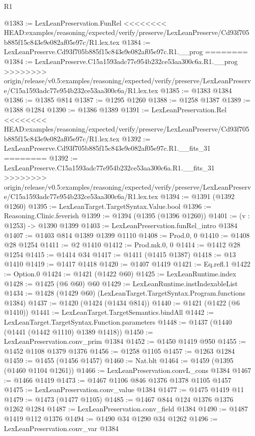 \begin{lexlean}{R1}
\begin{coremodule}
{{{{{{{{{{{{{{{{{{{{{{{{{{{{{{{{{{{{{{{{{{{{{{{{{{{{{{{{{{{{{{{{{{{{{{{{{{{{{{{{{{{{{{{{{{@1383 := LexLeanPreservation.FunRel
<<<<<<<< HEAD:examples/reasoning/expected/verify/preserve/LexLeanPreserve/Cd93f705b885f15c843e9e082af05e97c/R1.lex.tex
@1384 := LexLeanPreserve.Cd93f705b885f15c843e9e082af05e97c.R1.__prog
========
@1384 := LexLeanPreserve.C15a1593adc77e954b232ce53aa300c6a.R1.__prog
>>>>>>>> origin/release/v0.5:examples/reasoning/expected/verify/preserve/LexLeanPreserve/C15a1593adc77e954b232ce53aa300c6a/R1.lex.tex
@1385 := @1383 @1384
@1386 := @1385 @814
@1387 := @1295 @1260
@1388 := @1258 @1387
@1389 := @1388 @1284
@1390 := @1386 @1389
@1391 := LexLeanPreservation.Rel
<<<<<<<< HEAD:examples/reasoning/expected/verify/preserve/LexLeanPreserve/Cd93f705b885f15c843e9e082af05e97c/R1.lex.tex
@1392 := LexLeanPreserve.Cd93f705b885f15c843e9e082af05e97c.R1.__fits_31
========
@1392 := LexLeanPreserve.C15a1593adc77e954b232ce53aa300c6a.R1.__fits_31
>>>>>>>> origin/release/v0.5:examples/reasoning/expected/verify/preserve/LexLeanPreserve/C15a1593adc77e954b232ce53aa300c6a/R1.lex.tex
@1394 := @1391 (@1392 @1260)
@1395 := LexLeanTarget.TargetSyntax.Value.bool
@1396 := Reasoning.Clinic.feverish
@1399 := @1394 (@1395 (@1396 @1260))
@1401 := (v : @1253) -> @1390 @1399
@1403 := LexLeanPreservation.funRel_intro @1384
@1407 := @1403 @814 @1389 @1399 @1110
@1408 := Prod.{0, 0}
@1410 := @1408 @28 @1254
@1411 := @2 @1410
@1412 := Prod.mk.{0, 0}
@1414 := @1412 @28 @1254
@1415 := @1414 @34
@1417 := @1411 (@1415 @1387)
@1418 := @13 @1410
@1419 := @1417 @1418
@1420 := @1407 @1419
@1421 := Eq.refl.{1}
@1422 := Option.{0}
@1424 := @1421 (@1422 @60)
@1425 := LexLeanRuntime.index
@1428 := @1425 (@6 @60) @60
@1429 := LexLeanRuntime.instIndexableList
@1434 := @1428 (@1429 @60) (LexLeanTarget.TargetSyntax.Program.functions @1384)
@1437 := @1420 (@1424 (@1434 @814))
@1440 := @1421 (@1422 (@6 @1410))
@1441 := LexLeanTarget.TargetSemantics.bindAll
@1442 := LexLeanTarget.TargetSyntax.Function.parameters
@1448 := @1437 (@1440 (@1441 (@1442 @1110) @1389 @1418))
@1450 := LexLeanPreservation.conv_prim @1384
@1452 := @1450 @1419 @950
@1455 := @1452 @1108 @1379 @1376
@1456 := @1258 @1105
@1457 := @1263 @1284
@1459 := @1455 (@1456 @1457)
@1460 := Nat.blt
@1464 := @1459 (@1395 (@1460 @1104 @1261))
@1466 := LexLeanPreservation.convL_cons @1384
@1467 := @1466 @1419
@1473 := @1467 @1106 @846 @1376 @1378 @1105 @1457
@1475 := LexLeanPreservation.conv_value @1384
@1477 := @1475 @1419 @11
@1479 := @1473 (@1477 @1105)
@1485 := @1467 @844 @124 @1376 @1376 @1262 @1284
@1487 := LexLeanPreservation.conv_field @1384
@1490 := @1487 @1419 @112 @1376
@1494 := @1490 @34 @1290 @34 @1262
@1496 := LexLeanPreservation.conv_var @1384
}}}}}}}}}}}}}}}}}}}}}}}}}}}}}}}}}}}}}}}}}}}}}}}}}}}}}}}}}}}}}}}}}}}}}}}}}}}}}}}}}}}}}}}}}}
\end{coremodule}
\end{lexlean}
